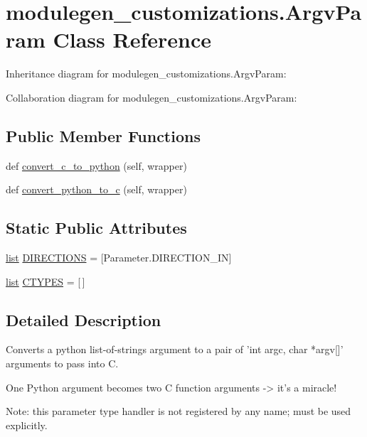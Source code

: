 \hypertarget{classmodulegen__customizations_1_1ArgvParam}{}\section{modulegen\+\_\+customizations.\+Argv\+Param Class Reference}
\label{classmodulegen__customizations_1_1ArgvParam}


Inheritance diagram for modulegen\+\_\+customizations.\+Argv\+Param\+:


Collaboration diagram for modulegen\+\_\+customizations.\+Argv\+Param\+:
\subsection*{Public Member Functions}
\begin{DoxyCompactItemize}
\item 
def \hyperlink{classmodulegen__customizations_1_1ArgvParam_adbba0b7fbbfbd1d8cd1f91aef899f9f0}{convert\+\_\+c\+\_\+to\+\_\+python} (self, wrapper)
\item 
def \hyperlink{classmodulegen__customizations_1_1ArgvParam_ad518a7e0a127f301ff0ee0f8b9ad1fed}{convert\+\_\+python\+\_\+to\+\_\+c} (self, wrapper)
\end{DoxyCompactItemize}
\subsection*{Static Public Attributes}
\begin{DoxyCompactItemize}
\item 
\hyperlink{openflow-interface_8h_afd9bcfa176617760671b67580f536fa7}{list} \hyperlink{classmodulegen__customizations_1_1ArgvParam_ae66ae412c4269d6caac50c994f61d548}{D\+I\+R\+E\+C\+T\+I\+O\+NS} = \mbox{[}Parameter.\+D\+I\+R\+E\+C\+T\+I\+O\+N\+\_\+\+IN\mbox{]}
\item 
\hyperlink{openflow-interface_8h_afd9bcfa176617760671b67580f536fa7}{list} \hyperlink{classmodulegen__customizations_1_1ArgvParam_a3c181cd1071bedc3e0d70219db4ab740}{C\+T\+Y\+P\+ES} = \mbox{[}$\,$\mbox{]}
\end{DoxyCompactItemize}


\subsection{Detailed Description}
\begin{DoxyVerb}Converts a python list-of-strings argument to a pair of 'int argc,
char *argv[]' arguments to pass into C.

One Python argument becomes two C function arguments -> it's a miracle!

Note: this parameter type handler is not registered by any name;
must be used explicitly.
\end{DoxyVerb}
 

